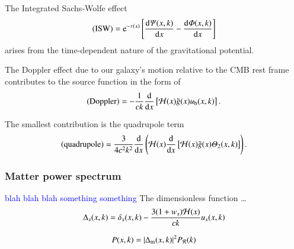     The Integrated Sachs-Wolfe effect %
    \begin{equation}
        \text{(ISW)} = \eu[-\tau(x)] \left[ \dv{\Psi(x,k)}{x}-  \dv{\Phi(x,k)}{x} \right]
    \end{equation}
    arises from the time-dependent nature of the gravitational potential.

    The Doppler effect due to our galaxy's motion relative to the CMB rest frame contributes to the source function in the form of
    \begin{equation}
        \text{(Doppler)} = - \frac{1}{ck} \dv{}{x} \left[\mathcal{H}(x) \tilde{g}(x) u_\mathrm{b}(x,k) \right].
    \end{equation}

    The smallest contribution is the quadrupole term 
    \begin{equation}
        \text{(quadrupole)} =  \frac{3}{4c^2k^2} \dv{}{x} \left(\mathcal{H}(x) \dv{}{x} \left[ \mathcal{H}(x) \tilde{g}(x) \varTheta_2(x,k) \right] \right).
    \end{equation}



\subsubsection{Matter power spectrum}
    \textcolor{blue}{blah blah blah something something}
    The dimensionless function \dots
    \begin{equation}\label{mil4:theo:eq:Delta_s_of_x_k}
        \Delta_s (x,k) = \delta_s(x,k) - \frac{3(1+w_s)\mathcal{H}(x)}{ck}u_s(x,k)
    \end{equation}

    \begin{equation}\label{mil4:theo:eq:matter_power_spectrum}
        P(x,k) = \abs{\Delta_\mathrm{m}(x,k)}^2 P_\mathcal{R}(k)
    \end{equation}


    